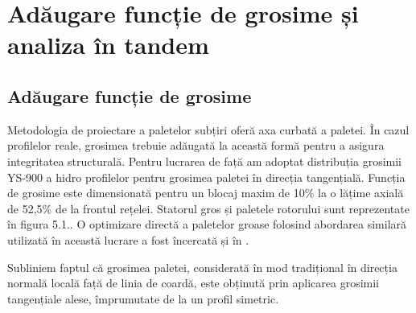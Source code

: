 \chapter{Adăugare funcție de grosime și analiza în tandem}\label{chapter:grosime}

\section{Adăugare funcție de grosime}

Metodologia de proiectare a paletelor subțiri oferă axa curbată a paletei. În cazul profilelor reale, grosimea trebuie adăugată la această formă pentru a asigura integritatea structurală. Pentru lucrarea de față am adoptat distribuția grosimii YS-900 a hidro profilelor \cite{eppler1979wing} pentru grosimea paletei în direcția tangențială. Funcția de grosime este dimensionată pentru un blocaj maxim de 10\% la o lățime axială de 52,5\% de la frontul rețelei. Statorul gros și paletele rotorului sunt reprezentate în figura 5.1.. O optimizare directă a paletelor groase folosind abordarea similară utilizată în această lucrare a fost încercată și în \cite{frunzua2010optimization}.

Subliniem faptul că grosimea paletei, considerată în mod tradițional în direcția normală locală față de linia de coardă, este obținută prin aplicarea grosimii tangențiale alese, împrumutate de la un profil simetric.

